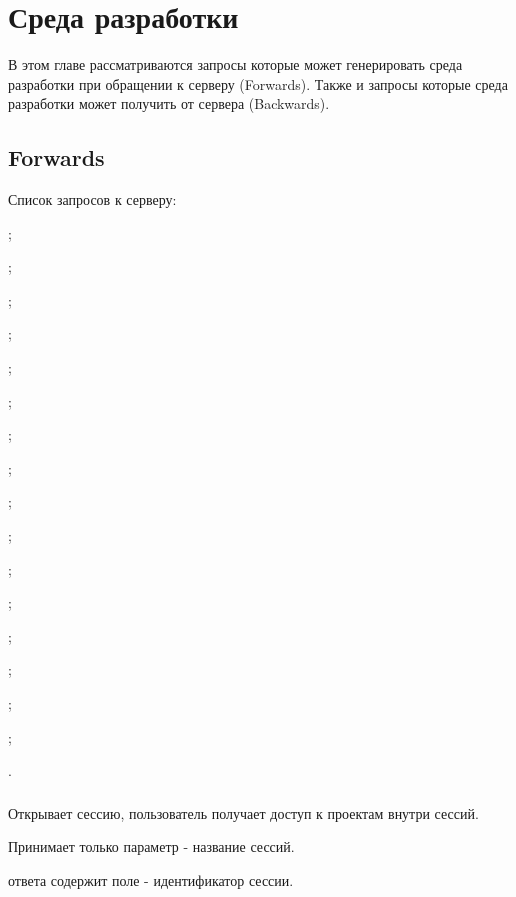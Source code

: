 \section{Среда разработки}

В этом главе рассматриваются запросы которые может генерировать среда разработки при обращении к серверу (Forwards). Также и запросы которые среда разработки может получить от сервера (Backwards).

\subsection{Forwards}

Список запросов к серверу:
\begin{icItems}
	\item {};
	\item {};
	\item {};
	\item {};
	\item {};
	\item {};
	\item {};
	\item {};
	\item {};
	\item {};
	\item {};
	\item {};
	\item {};
	\item {};
	\item {};
	\item {};
	\item {}.
\end{icItems}

\subsubsection{}

Открывает сессию, пользователь получает доступ к проектам внутри сессий.

Принимает только параметр  - название сессий.

 ответа содержит поле  - идентификатор сессии.

